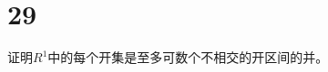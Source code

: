 \paragraph{}
\paragraph{}
\paragraph{}
\paragraph{}
\paragraph{}
\paragraph{}
\paragraph{}
\paragraph{}
\paragraph{}
\paragraph{}
\section*{29} 证明$R^1$中的每个开集是至多可数个不相交的开区间的并。
\paragraph{}
\paragraph{}
\paragraph{}
\paragraph{}
